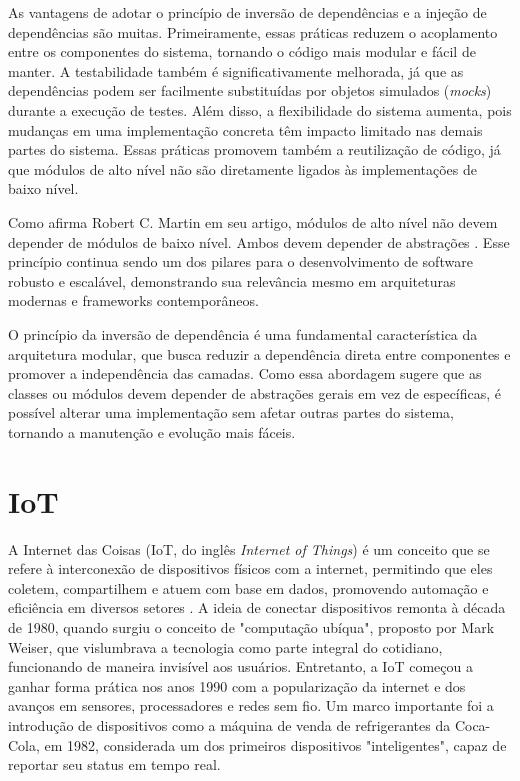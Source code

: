 As vantagens de adotar o princípio de inversão de dependências e a injeção de dependências são muitas. Primeiramente, essas práticas reduzem o acoplamento entre os componentes do sistema, tornando o código mais modular e fácil de manter. A testabilidade também é significativamente melhorada, já que as dependências podem ser facilmente substituídas por objetos simulados (\textit{mocks}) durante a execução de testes. Além disso, a flexibilidade do sistema aumenta, pois mudanças em uma implementação concreta têm impacto limitado nas demais partes do sistema. Essas práticas promovem também a reutilização de código, já que módulos de alto nível não são diretamente ligados às implementações de baixo nível.

Como afirma Robert C. Martin em seu artigo, módulos de alto nível não devem depender de módulos de baixo nível. Ambos devem depender de abstrações \cite{martin2000design}. Esse princípio continua sendo um dos pilares para o desenvolvimento de software robusto e escalável, demonstrando sua relevância mesmo em arquiteturas modernas e frameworks contemporâneos.

O princípio da inversão de dependência é uma fundamental característica da arquitetura modular, que busca reduzir a dependência direta entre componentes e promover a independência das camadas. Como essa abordagem sugere que as classes ou módulos devem depender de abstrações gerais em vez de específicas, é possível alterar uma implementação sem afetar outras partes do sistema, tornando a manutenção e evolução mais fáceis.

\section{IoT}

A Internet das Coisas (IoT, do inglês \textit{Internet of Things}) é um conceito que se refere à interconexão de dispositivos físicos com a internet, permitindo que eles coletem, compartilhem e atuem com base em dados, promovendo automação e eficiência em diversos setores \cite{gokhale2018introduction}. A ideia de conectar dispositivos remonta à década de 1980, quando surgiu o conceito de "computação ubíqua", proposto por Mark Weiser, que vislumbrava a tecnologia como parte integral do cotidiano, funcionando de maneira invisível aos usuários. Entretanto, a IoT começou a ganhar forma prática nos anos 1990 com a popularização da internet e dos avanços em sensores, processadores e redes sem fio. Um marco importante foi a introdução de dispositivos como a máquina de venda de refrigerantes da Coca-Cola, em 1982, considerada um dos primeiros dispositivos "inteligentes", capaz de reportar seu status em tempo real.

